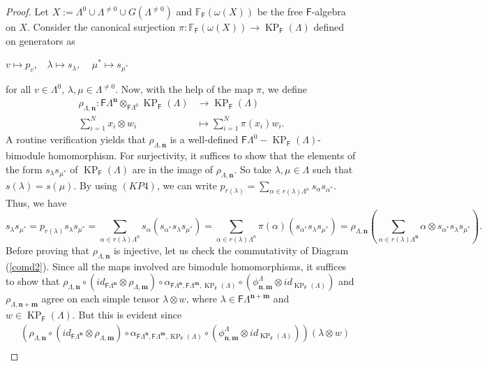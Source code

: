 \documentclass[12pt]{amsart}
\newcommand{\N}{\mathbf{n}}
\newcommand{\M}{\mathbf{m}}
\newcommand{\KP}{\operatorname{KP}}
\theoremstyle{definition}
\theoremstyle{remark}
\begin{document}
\begin{proof}
Let $X:=\Lambda^0\cup \Lambda^{\neq 0}\cup G(\Lambda^{\neq 0})$ and $\mathbb{F}_\mathsf{F}(\omega(X))$ be the free $\mathsf{F}$-algebra on $X$. Consider the canonical surjection $\pi: \mathbb{F}_\mathsf{F}(\omega(X)) \longrightarrow \KP_\mathsf{F}(\Lambda)$ defined on generators as
\begin{center}
$v\longmapsto p_v,~~~~\lambda\longmapsto s_\lambda,~~~~~\mu^*\longmapsto s_{\mu^*}$
\end{center}
for all $v\in \Lambda^0$, $\lambda,\mu\in \Lambda^{\neq 0}$. Now, with the help of the map $\pi$, we define
\begin{align*}
    \rho_{\Lambda,\N}:\mathsf{F}\Lambda^\N\otimes_{\mathsf{F}\Lambda^0}\KP_\mathsf{F}(\Lambda) &\longrightarrow \KP_\mathsf{F}(\Lambda)\\
    \displaystyle{\sum_{i=1}^{N}} x_i\otimes w_i &\longmapsto \displaystyle{\sum_{i=1}^{N}} \pi(x_i)w_i.
\end{align*}
A routine verification yields that $\rho_{\Lambda,\N}$ is a well-defined $\mathsf{F}\Lambda^0-\KP_\mathsf{F}(\Lambda)$-bimodule homomorphism. For surjectivity, it suffices to show that the elements of the form $s_\lambda s_{\mu^*}$ of $\KP_\mathsf{F}(\Lambda)$ are in the image of $\rho_{\Lambda,\N}$. So take $\lambda,\mu\in \Lambda$ such that $s(\lambda)=s(\mu)$. By using $(KP4)$, we can write $p_{r(\lambda)}=\displaystyle{\sum_{\alpha\in r(\lambda)\Lambda^n}}s_\alpha s_{\alpha^*}$. Thus, we have
\[s_\lambda s_{\mu^*}=p_{r(\lambda)}s_\lambda s_{\mu^*}=\displaystyle{\sum_{\alpha\in r(\lambda)\Lambda^n}}s_\alpha (s_{\alpha^*}s_\lambda s_{\mu^*})=\displaystyle{\sum_{\alpha\in r(\lambda)\Lambda^n}}\pi(\alpha) (s_{\alpha^*}s_\lambda s_{\mu^*})=\rho_{\Lambda,\N}\left(\displaystyle{\sum_{\alpha\in r(\lambda)\Lambda^\N}} \alpha\otimes s_{\alpha^*}s_\lambda s_{\mu^*}\right).\]
Before proving that $\rho_{\Lambda,\N}$ is injective, let us check the commutativity of Diagram (\ref{comd2}). Since all the maps involved are bimodule homomorphisms, it suffices to show that $\rho_{\Lambda,\N}\circ (id_{\mathsf{F}\Lambda^\N}\otimes \rho_{\Lambda,\M})\circ \alpha_{\mathsf{F}\Lambda^\N,\mathsf{F}\Lambda^\M,\KP_\mathsf{F}(\Lambda)}\circ (\phi_{\N,\M}^\Lambda\otimes id_{\KP_\mathsf{F}(\Lambda)})$ and $\rho_{\Lambda,\N+\M}$ agree on each simple tensor $\lambda\otimes w$, where $\lambda\in \mathsf{F}\Lambda^{\N+\M}$ and $w\in \KP_\mathsf{F}(\Lambda)$. But this is evident since 
\begin{align*}
&\left(\rho_{\Lambda,\N}\circ (id_{\mathsf{F}\Lambda^\N}\otimes \rho_{\Lambda,\M})\circ \alpha_{\mathsf{F}\Lambda^\N,\mathsf{F}\Lambda^\M,\KP_\mathsf{F}(\Lambda)}\circ (\phi_{\N,\M}^\Lambda\otimes id_{\KP_\mathsf{F}(\Lambda)})\right)(\lambda\otimes w)\\

\end{align*}
\end{proof}
\end{document}

